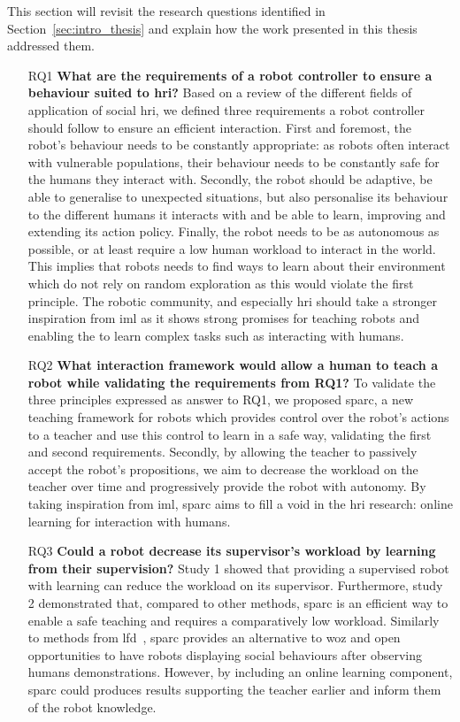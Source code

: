 This section will revisit the research questions identified in Section~\ref{sec:intro_thesis} and explain how the work presented in this thesis addressed them.
\begin{itemize}
\item [RQ1] \textbf{What are the requirements of a robot controller to ensure a behaviour suited to \gls{hri}?} 
Based on a review of the different fields of application of social \gls{hri}, we defined three requirements a robot controller should follow to ensure an efficient interaction. First and foremost, the robot's behaviour needs to be constantly appropriate: as robots often interact with vulnerable populations, their behaviour needs to be constantly safe for the humans they interact with. Secondly, the robot should be adaptive, be able to generalise to unexpected situations, but also personalise its behaviour to the different humans it interacts with and be able to learn, improving and extending its action policy. Finally, the robot needs to be as autonomous as possible, or at least require a low human workload to interact in the world. This implies that robots needs to find ways to learn about their environment which do not rely on random exploration as this would violate the first principle. The robotic community, and especially \gls{hri} should take a stronger inspiration from \gls{iml} as it shows strong promises for teaching robots and enabling the to learn complex tasks such as interacting with humans.

\item [RQ2] \textbf{What interaction framework would allow a human to teach a robot while validating the requirements from RQ1?}
To validate the three principles expressed as answer to RQ1, we proposed \gls{sparc}, a new teaching framework for robots which provides control over the robot's actions to a teacher and use this control to learn in a safe way, validating the first and second requirements. Secondly, by allowing the teacher to passively accept the robot's propositions, we aim to decrease the workload on the teacher over time and progressively provide the robot with autonomy. By taking inspiration from \gls{iml}, \gls{sparc} aims to fill a void in the \gls{hri} research: online learning for interaction with humans.

\item [RQ3] \textbf{Could a robot decrease its supervisor's workload by learning from their supervision?}
Study 1 showed that providing a supervised robot with learning can reduce the workload on its supervisor. Furthermore, study 2 demonstrated that, compared to other methods, \gls{sparc} is an efficient way to enable a safe teaching and requires a comparatively low workload. Similarly to methods from \gls{lfd}~\citep{liu2014train,sequeira2016discovering}, \gls{sparc} provides an alternative to \gls{woz} and open opportunities to have robots displaying social behaviours after observing humans demonstrations. However, by including an online learning component, \gls{sparc} could produces results supporting the teacher earlier and inform them of the robot knowledge.


\end{itemize}
